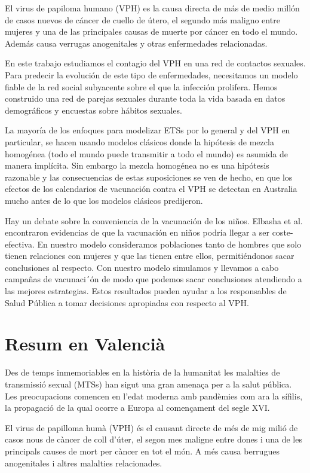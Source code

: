 El virus de papiloma humano (VPH) es la causa directa de m\'as de medio mill\'on de casos nuevos de c\'ancer de cuello de \'utero, el segundo m\'as maligno entre mujeres y una de las principales causas de muerte por c\'ancer en todo el mundo. Adem\'as causa verrugas anogenitales y otras enfermedades relacionadas.

En este trabajo estudiamos el contagio del VPH en una red de contactos sexuales. Para predecir la evoluci\'on de este tipo de enfermedades, necesitamos un modelo fiable de la red social subyacente sobre el que la infecci\'on prolifera. Hemos construido una red de parejas sexuales durante toda la vida basada en datos demogr\'aficos y encuestas sobre h\'abitos sexuales.

La mayor\'ia de los enfoques para modelizar ETSs por lo general y del VPH en particular, se hacen usando modelos cl\'asicos donde la hip\'otesis de mezcla homog\'enea (todo el mundo puede transmitir a todo el mundo) es asumida de manera impl\'icita. Sin embargo la mezcla homog\'enea no es una hip\'otesis razonable y las consecuencias de estas suposiciones se ven de hecho, en que los efectos de los calendarios de vacunaci\'on contra el VPH se detectan en Australia mucho antes de lo que los modelos cl\'asicos predijeron.

Hay un debate sobre la conveniencia de la vacunaci\'on de los ni\~nos. Elbasha et al. encontraron evidencias de que la vacunaci\'on en ni\~nos podr\'ia llegar a ser coste-efectiva. En nuestro modelo consideramos poblaciones tanto de hombres que solo tienen relaciones con mujeres y que las tienen entre ellos, permiti\'endonos sacar conclusiones al respecto. Con nuestro modelo simulamos y llevamos a cabo campa\~nas de vacunaci´\'on de modo que podemos sacar conclusiones atendiendo a las mejores estrategias. Estos resultados pueden ayudar a los responsables de Salud P\'ublica a tomar decisiones apropiadas con respecto al VPH.

\chapter*{Resum en Valenci\`a}
Des de temps inmemoriables en la hist\`oria de la humanitat les malalties de transmissi\'o sexual (MTSs) han sigut una gran amena\c{c}a per a la salut p\'ublica. Les preocupacions comencen en l'edat moderna amb pand\`emies com ara la s\'ifilis, la propagaci\'o de la qual ocorre a Europa al comen\c{c}ament del segle XVI. 

El virus de papilloma hum\`a (VPH) \'es el causant directe de m\'es de mig mili\'o de casos nous de c\`ancer de coll d'\'uter, el segon mes maligne entre dones i una de les principals causes de mort per c\`ancer en tot el m\'on. A m\'es causa berrugues anogenitales i altres malalties relacionades. 

